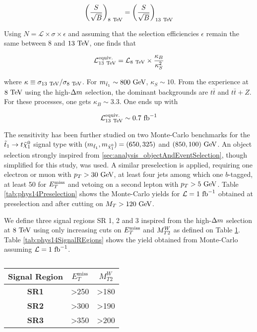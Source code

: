         $$ \left( \frac{S}{\sqrt{B}} \right)_{8~\text{TeV}} = \left( \frac{S}{\sqrt{B}} \right)_{13~\text{TeV}}  $$

        Using $N = \mathcal{L} \times \sigma \times \epsilon$ and assuming that the selection
        efficiencies $\epsilon$ remain the same between $8$ and $13~\text{TeV}$, one finds that
        
        $$ \mathcal{L}^\text{equiv.}_{13~\text{TeV}} = \mathcal{L}_{8~\text{TeV}} \times \frac{\kappa_B}{\kappa^2_S} $$

        where $\kappa \equiv \sigma_{13~\text{TeV}} / \sigma_{8~\text{TeV}}$. For $m_{\tilde{t}_1} \sim 800~\text{GeV}$,
        $\kappa_S \sim 10$. From the experience at $8~\text{TeV}$ using the high-$\Delta m$ selection,
        the dominant backgrounds are $t\bar{t}$ and $t\bar{t}+Z$. For these processes, one
        gets $\kappa_B \sim 3.3$. One ends up with

        $$ \mathcal{L}^\text{equiv.}_{13~\text{TeV}} \sim 0.7~\text{fb}^{-1}$$

        The sensitivity has been further studied on two Monte-Carlo benchmarks for the 
        $\tilde{t}_1 \rightarrow t \tilde{\chi}_1^0$ signal type with $(m_{\tilde{t}_1},
        m_{\tilde{\chi}_1^0}) = (650,325)$ and $(850,100) ~\text{GeV}$. An object selection 
        strongly inspired from \ref{sec:analysis_objectAndEventSelection}, though simplified
        for this study, was used. A similar preselection is applied, requiring one electron
        or muon with $p_T > 30~\text{GeV}$, at least four jets among which one $b$-tagged, at least
        50 \GeV for $E_T^\text{miss}$ and vetoing on a second lepton with $p_T > 5~\text{GeV}$. Table \ref{tab:phys14Preselection}
        shows the Monte-Carlo yields for $\mathcal{L} = 1~\text{fb}^{-1}$ obtained at preselection 
        and after cutting on $M_T > 120~\text{GeV}$.

        \begin{table}
            \centering
             
            \caption{ \label{tab:phys14Preselection}}
        \end{table}

        We define three signal regions SR 1, 2 and 3 inspired from the high-$\Delta m$
        selection at $8~\text{TeV}$ using only increasing cuts on $E_T^\text{miss}$ and $M_{T2}^W$ as defined
        on Table \ref{tab:phys14Cuts}. Table \ref{tab:phys14SignalREgions} shows the yield 
        obtained from Monte-Carlo assuming $\mathcal{L} = 1~\text{fb}^{-1}$. 

        \begin{table}
            \centering
            \begin{tabular}{c|cc}
                \textbf{Signal Region} & $E_T^\text{miss}$ & $M_{T2}^W$ \\
                \hline
                \textbf{SR1}           & >250 & >180 \\
                \textbf{SR2}           & >300 & >190 \\
                \textbf{SR3}           & >350 & >200 \\
            \end{tabular}
            \caption{ \label{tab:phys14Cuts}}
        \end{table}

